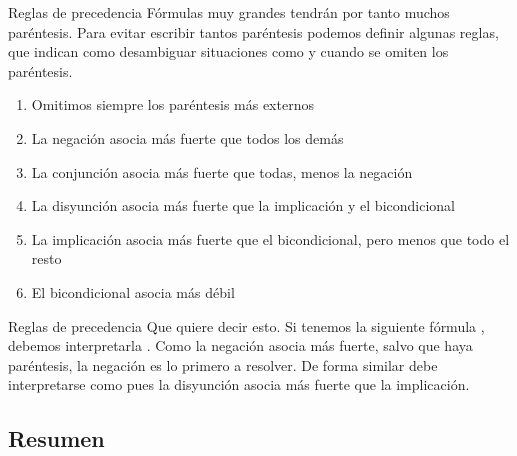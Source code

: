 
\begin{frame}{Reglas de precedencia}
  Fórmulas muy grandes tendrán por tanto muchos paréntesis. Para evitar escribir
  tantos paréntesis podemos definir algunas reglas, que indican como desambiguar
  situaciones como  y 
  cuando se omiten los paréntesis.
  \jump
  \begin{enumerate}
    \item Omitimos siempre los paréntesis más externos
    \item La negación asocia más fuerte que todos los demás
    \item La conjunción asocia más fuerte que todas, menos la negación
    \item La disyunción asocia más fuerte que la implicación y el bicondicional
    \item La implicación asocia más fuerte que el bicondicional, pero menos que todo el resto
    \item El bicondicional asocia más débil
  \end{enumerate}
\end{frame}


\begin{frame}{Reglas de precedencia}
  Que quiere decir esto. Si tenemos la siguiente fórmula ,
  debemos interpretarla . Como la negación asocia
  más fuerte, salvo que haya paréntesis, la negación es lo primero a resolver.
  \jump
  De forma similar  debe interpretarse como
   pues la disyunción asocia más fuerte que
  la implicación.
\end{frame}


\subsection{Resumen}


